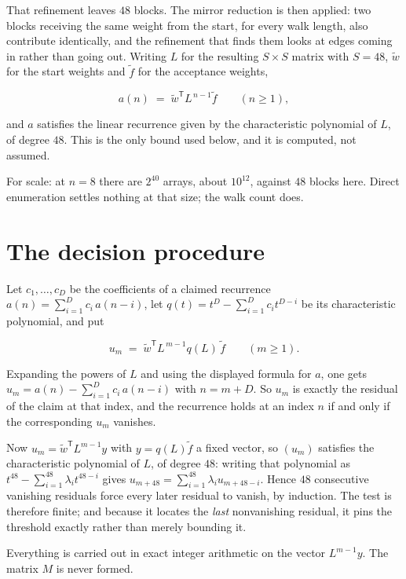 \documentclass[11pt]{article}
\theoremstyle{definition}
\begin{document}
That refinement leaves $48$ blocks. The mirror reduction is then applied: two blocks receiving the same weight from the start, for every walk length, also contribute identically, and the refinement that finds them looks at edges coming in rather than going out. Writing $L$ for the resulting $S \times S$ matrix with $S = 48$, $\tilde w$ for the start weights and $\tilde f$ for the acceptance weights,

\[a(n) \;=\; \tilde w^{\mathsf T} L^{\,n-1} \tilde f \qquad (n \ge 1),\]

and $a$ satisfies the linear recurrence given by the characteristic polynomial of $L$, of degree $48$. This is the only bound used below, and it is computed, not assumed.

For scale: at $n = 8$ there are $2^{40}$ arrays, about $10^{12}$, against $48$ blocks here. Direct enumeration settles nothing at that size; the walk count does.

\section{The decision procedure}

Let $c_1,\dots,c_D$ be the coefficients of a claimed recurrence $a(n) = \sum_{i=1}^{D} c_i\,a(n-i)$, let $q(t) = t^{D} - \sum_{i=1}^{D} c_i t^{D-i}$ be its characteristic polynomial, and put

\[u_m \;=\; \tilde w^{\mathsf T} L^{\,m-1} q(L)\,\tilde f \qquad (m \ge 1).\]

Expanding the powers of $L$ and using the displayed formula for $a$, one gets $u_m = a(n) - \sum_{i=1}^{D} c_i\,a(n-i)$ with $n = m + D$. So $u_m$ is exactly the residual of the claim at that index, and the recurrence holds at an index $n$ if and only if the corresponding $u_m$ vanishes.

Now $u_m = \tilde w^{\mathsf T} L^{m-1} y$ with $y = q(L)\tilde f$ a fixed vector, so $(u_m)$ satisfies the characteristic polynomial of $L$, of degree $48$: writing that polynomial as $t^{48} - \sum_{i=1}^{48} \lambda_i t^{48-i}$ gives $u_{m+48} = \sum_{i=1}^{48} \lambda_i u_{m+48-i}$. Hence $48$ consecutive vanishing residuals force every later residual to vanish, by induction. The test is therefore finite; and because it locates the {\itshape last} nonvanishing residual, it pins the threshold exactly rather than merely bounding it.

Everything is carried out in exact integer arithmetic on the vector $L^{m-1}y$. The matrix $M$ is never formed.
\end{document}
